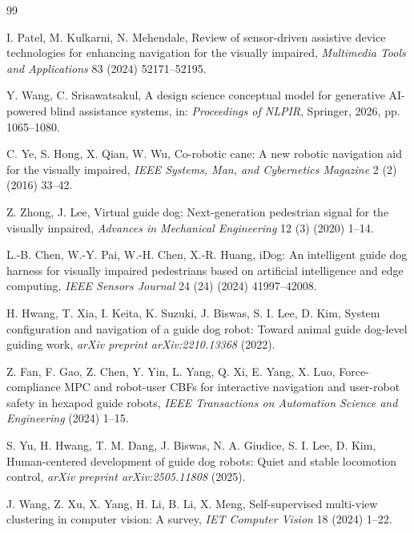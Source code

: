 \documentclass[11pt, a4paper]{article}
\begin{document}
\begin{thebibliography}{99}

I. Patel, M. Kulkarni, N. Mehendale, Review of sensor-driven assistive device technologies for enhancing navigation for the visually impaired, \textit{Multimedia Tools and Applications} 83 (2024) 52171--52195.

Y. Wang, C. Srisawatsakul, A design science conceptual model for generative AI-powered blind assistance systems, in: \textit{Proceedings of NLPIR}, Springer, 2026, pp. 1065--1080.

C. Ye, S. Hong, X. Qian, W. Wu, Co-robotic cane: A new robotic navigation aid for the visually impaired, \textit{IEEE Systems, Man, and Cybernetics Magazine} 2 (2) (2016) 33--42.

Z. Zhong, J. Lee, Virtual guide dog: Next-generation pedestrian signal for the visually impaired, \textit{Advances in Mechanical Engineering} 12 (3) (2020) 1--14.

L.-B. Chen, W.-Y. Pai, W.-H. Chen, X.-R. Huang, iDog: An intelligent guide dog harness for visually impaired pedestrians based on artificial intelligence and edge computing, \textit{IEEE Sensors Journal} 24 (24) (2024) 41997--42008.

H. Hwang, T. Xia, I. Keita, K. Suzuki, J. Biswas, S. I. Lee, D. Kim, System configuration and navigation of a guide dog robot: Toward animal guide dog-level guiding work, \textit{arXiv preprint arXiv:2210.13368} (2022).

Z. Fan, F. Gao, Z. Chen, Y. Yin, L. Yang, Q. Xi, E. Yang, X. Luo, Force-compliance MPC and robot-user CBFs for interactive navigation and user-robot safety in hexapod guide robots, \textit{IEEE Transactions on Automation Science and Engineering} (2024) 1--15.

S. Yu, H. Hwang, T. M. Dang, J. Biswas, N. A. Giudice, S. I. Lee, D. Kim, Human-centered development of guide dog robots: Quiet and stable locomotion control, \textit{arXiv preprint arXiv:2505.11808} (2025).

J. Wang, Z. Xu, X. Yang, H. Li, B. Li, X. Meng, Self-supervised multi-view clustering in computer vision: A survey, \textit{IET Computer Vision} 18 (2024) 1--22.


\end{thebibliography}
\end{document}
